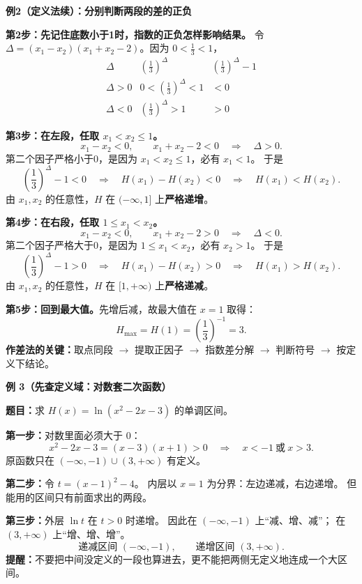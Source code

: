 \clearpage
\begin{examplebox}
\textbf{\textcolor{CExample}{例2（定义法续）：分别判断两段的差的正负}}

\textbf{第2步：先记住底数小于1时，指数的正负怎样影响结果。}
令 $\Delta=(x_1-x_2)(x_1+x_2-2)$。因为 $0<\frac13<1$，
\[
\begin{array}{c|c|c}
\Delta & \left(\frac13\right)^\Delta &
\left(\frac13\right)^\Delta-1\\ \hline
\Delta>0 & 0<\left(\frac13\right)^\Delta<1 & <0\\[4pt]
\Delta<0 & \left(\frac13\right)^\Delta>1 & >0
\end{array}
\]

\textbf{第3步：在左段，任取 $x_1<x_2\le1$。}
\[
 x_1-x_2<0,\qquad x_1+x_2-2<0
 \quad\Longrightarrow\quad \Delta>0.
\]
第二个因子严格小于0，是因为 $x_1<x_2\le1$，必有 $x_1<1$。
于是
\[
 \left(\frac13\right)^\Delta-1<0
 \quad\Longrightarrow\quad H(x_1)-H(x_2)<0
 \quad\Longrightarrow\quad H(x_1)<H(x_2).
\]
由 $x_1,x_2$ 的任意性，$H$ 在 $(-\infty,1]$ 上\textbf{严格递增}。

\medskip
\textbf{第4步：在右段，任取 $1\le x_1<x_2$。}
\[
 x_1-x_2<0,\qquad x_1+x_2-2>0
 \quad\Longrightarrow\quad \Delta<0.
\]
第二个因子严格大于0，是因为 $1\le x_1<x_2$，必有 $x_2>1$。
于是
\[
 \left(\frac13\right)^\Delta-1>0
 \quad\Longrightarrow\quad H(x_1)-H(x_2)>0
 \quad\Longrightarrow\quad H(x_1)>H(x_2).
\]
由 $x_1,x_2$ 的任意性，$H$ 在 $[1,+\infty)$ 上\textbf{严格递减}。

\medskip
\textbf{第5步：回到最大值。}先增后减，故最大值在 $x=1$ 取得：
\[
\boxed{H_{\max}=H(1)=\left(\frac13\right)^{-1}=3.}
\]
\textbf{作差法的关键：}取点同段 $\to$ 提取正因子 $\to$
指数差分解 $\to$ 判断符号 $\to$ 按定义下结论。


\medskip
\end{examplebox}
\clearpage
\begin{examplebox}
\textbf{\textcolor{CExample}{例 3（先查定义域：对数套二次函数）}}



\textbf{题目：}求 $H(x)=\ln(x^2-2x-3)$ 的单调区间。

\textbf{第一步：}对数里面必须大于 $0$：
\[
 x^2-2x-3=(x-3)(x+1)>0
 \quad\Longrightarrow\quad x<-1\ \text{或}\ x>3.
\]
原函数只在 $(-\infty,-1)\cup(3,+\infty)$ 有定义。

\textbf{第二步：}令 $t=(x-1)^2-4$。
内层以 $x=1$ 为分界：左边递减，右边递增。
但能用的区间只有前面求出的两段。

\textbf{第三步：}外层 $\ln t$ 在 $t>0$ 时递增。
因此在 $(-\infty,-1)$ 上“减、增、减”；
在 $(3,+\infty)$ 上“增、增、增”。
\[
\boxed{\text{递减区间 }(-\infty,-1),\qquad
       \text{递增区间 }(3,+\infty).}
\]
\textbf{提醒：}不要把中间没定义的一段也算进去，更不能把两侧无定义地连成一个大区间。

\medskip
\end{examplebox}
